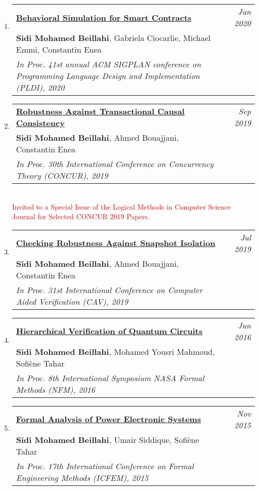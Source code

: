 \documentclass[10pt]{article}
\makeatletter
\newcommand{\lbar}[1]{{\color{#1}\ding{118}}\hspace*{2pt}}
\newenvironment{benumerate}[2]{
    \let\oldItem\item
    \def\item{\addtocounter{enumi}{-2}\oldItem}
    \begin{enumerate}[#2] \itemsep3pt
    \setcounter{enumi}{#1}
    \addtocounter{enumi}{1}}
  {\end{enumerate}}
\newenvironment{publication}[5]
{ \item
  \begin{tabular*}{7.5in}{p{6.3in}@{\extracolsep{\fill}}r}
    \href{#1}{\textbf{#2}} & \textit{#3}\\ #4 &\\ \textit{#5}&\\
  \end{tabular*}
} {}
\newenvironment{region}[3]{%
  \vspace*{0.5ex}
  {\scalebox{1.4}{\textbf{#1}}}
  \begin{benumerate}{#3}{\color{RoyalBlue}#2}}
  {\end{benumerate}\vspace{0.8ex}}
\makeatother
\begin{document}
\begin{region} {\lbar{purple}Conference Publications}{{C}1}{17}
	\begin{publication} {https://beillahi.github.io/papers/PLDI20.pdf}
		{Behavioral Simulation for Smart Contracts}
		{Jun 2020} {\textbf{Sidi Mohamed Beillahi}, Gabriela Ciocarlie, Michael Emmi, Constantin Enea}
		{In Proc. 41st annual ACM SIGPLAN conference on Programming Language Design and Implementation (PLDI), 2020}
  \end{publication}

	\begin{publication} {https://beillahi.github.io/papers/CONCUR19.pdf}
		{Robustness Against Transactional Causal Consistency}
		{Sep 2019} {\textbf{Sidi Mohamed Beillahi}, Ahmed Bouajjani, Constantin Enea}
    {In Proc. 30th International Conference on Concurrency Theory (CONCUR), 2019}
    {\\ \textcolor{red}{Invited to a Special Issue of the Logical Methods in Computer Science Journal for Selected CONCUR 2019 Papers.}}
  \end{publication}

  \begin{publication} {https://beillahi.github.io/papers/CAV19.pdf}
    {Checking Robustness Against Snapshot Isolation}
    {Jul 2019} {\textbf{Sidi Mohamed Beillahi}, Ahmed Bouajjani, Constantin Enea}
    {In Proc. 31st International Conference on Computer Aided Verification (CAV), 2019}
  \end{publication}

  \begin{publication} {https://beillahi.github.io/papers/NFM16.pdf}
    {Hierarchical Verification of Quantum Circuits}
    {Jun 2016} {\textbf{Sidi Mohamed Beillahi}, Mohamed Yousri Mahmoud, Sofi\`{e}ne Tahar}
    {In Proc. 8th International Symposium NASA Formal Methods (NFM), 2016}
  \end{publication}

  \begin{publication} {https://beillahi.github.io/papers/ICFEM15.pdf}
    {Formal Analysis of Power Electronic Systems}
    {Nov 2015} {\textbf{Sidi Mohamed Beillahi}, Umair Siddique, Sofi\`{e}ne Tahar}
    {In Proc. 17th International Conference on Formal Engineering Methods (ICFEM), 2015}
  \end{publication}

\end{region}
\end{document}
